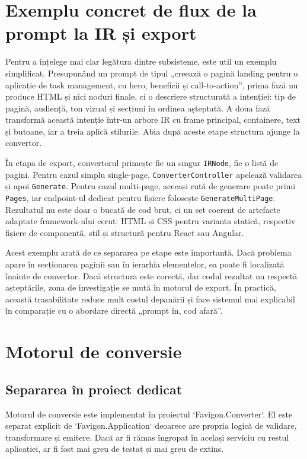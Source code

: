 \section{Exemplu concret de flux de la prompt la IR și export}

Pentru a înțelege mai clar legătura dintre subsisteme, este util un exemplu simplificat. Presupunând un prompt de tipul „creează o pagină landing pentru o aplicație de task management, cu hero, beneficii și call-to-action”, prima fază nu produce HTML și nici noduri finale, ci o descriere structurată a intenției: tip de pagină, audiență, ton vizual și secțiuni în ordinea așteptată. A doua fază transformă această intenție într-un arbore IR cu frame principal, containere, text și butoane, iar a treia aplică stilurile. Abia după aceste etape structura ajunge la convertor.

În etapa de export, convertorul primește fie un singur \texttt{IRNode}, fie o listă de pagini. Pentru cazul simplu single-page, \texttt{ConverterController} apelează validarea și apoi \texttt{Generate}. Pentru cazul multi-page, aceeași rută de generare poate primi \texttt{Pages}, iar endpoint-ul dedicat pentru fișiere folosește \texttt{GenerateMultiPage}. Rezultatul nu este doar o bucată de cod brut, ci un set coerent de artefacte adaptate framework-ului cerut: HTML și CSS pentru varianta statică, respectiv fișiere de componentă, stil și structură pentru React sau Angular.

Acest exemplu arată de ce separarea pe etape este importantă. Dacă problema apare în secționarea paginii sau în ierarhia elementelor, ea poate fi localizată înainte de convertor. Dacă structura este corectă, dar codul rezultat nu respectă așteptările, zona de investigație se mută în motorul de export. În practică, această trasabilitate reduce mult costul depanării și face sistemul mai explicabil în comparație cu o abordare directă „prompt în, cod afară”.

\section{Motorul de conversie}

\subsection{Separarea în proiect dedicat}

Motorul de conversie este implementat în proiectul `Favigon.Converter`. El este separat explicit de `Favigon.Application` deoarece are propria logică de validare, transformare și emitere. Dacă ar fi rămas îngropat în același serviciu cu restul aplicației, ar fi fost mai greu de testat și mai greu de extins.

